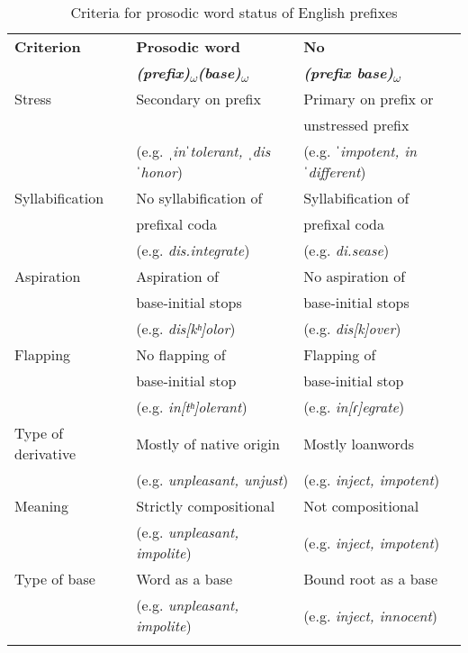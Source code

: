 \begin{table*}
	\caption{Criteria for prosodic word status of English prefixes \citep{Raffelsiefen.1999}}
	\label{tbl:Criteria for prosodic work status of English prefixes (Raffelsiefen 1999)}
	\begin{tabular}{lll}
		\lsptoprule
		\textbf{Criterion} & \textbf{Prosodic word }&\textbf{ No \isi{prosodic word} }\\ 
		&\textbf{\textit{(prefix)\textsubscript{$\omega$}(base)\textsubscript{$\omega$}}}& \textbf{\textit{(prefix base)\textsubscript{$\omega$}}}
		\\
		\midrule 
		
		Stress & Secondary \isi{stress} on prefix & Primary \isi{stress} on prefix or  \\ 
		& 												& unstressed prefix \\
		&(e.g. \textit{ˌinˈtolerant, ˌdisˈhonor}) & (e.g. \textit{ ˈimpotent, inˈdifferent})
		\\ 
		
		Syllabification & No syllabification of  & Syllabification of  \\
		&  prefixal coda 				& prefixal coda \\
		& (e.g. \textit{dis.integrate})& (e.g. \textit{di.sease}) 
		\\ 
		
		Aspiration & Aspiration of 		& No aspiration of  \\
		& base-initial stops &  base-initial stops \\
		& (e.g. \textit{dis[kʰ]olor}) & (e.g. \textit{dis[k]over})
		\\  
		
		
		Flapping & No flapping of  		& Flapping of\\
		&  base-initial stop 	& base-initial stop\\
		& (e.g. \textit{in[tʰ]olerant}) & (e.g. \textit{in[ɾ]egrate})
		\\   
		
		Type of derivative & Mostly of native origin & Mostly loanwords \\ 
		& (e.g. \textit{unpleasant, unjust}) & (e.g. \textit{inject, impotent})
		\\ 
		
		Meaning & Strictly compositional & Not compositional\\
		& (e.g. \textit{unpleasant, impolite}) & (e.g. \textit{inject, impotent})
		\\  
		
		Type of base & Word as a base & Bound root as a base\\
		& (e.g. \textit{unpleasant, impolite}) & (e.g. \textit{inject, innocent})
		\\ 
		
		
		\lspbottomrule                                                                                
	\end{tabular}
\end{table*}


